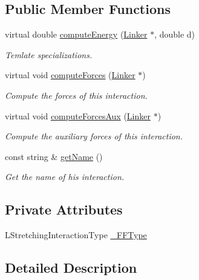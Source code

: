\subsection*{Public Member Functions}
\begin{DoxyCompactItemize}
\item 
virtual double \hyperlink{classLinkerStretching_aaca285f2ce307bb4d5f151ae88f46f95}{compute\+Energy} (\hyperlink{classLinker}{Linker} $\ast$, double d)
\begin{DoxyCompactList}\small\item\em Temlate specializations. \end{DoxyCompactList}\item 
virtual void \hyperlink{classLinkerStretching_a3db719101f86eb671ad0973e0e0569cd}{compute\+Forces} (\hyperlink{classLinker}{Linker} $\ast$)
\begin{DoxyCompactList}\small\item\em Compute the forces of this interaction. \end{DoxyCompactList}\item 
virtual void \hyperlink{classLinkerStretching_af9beb4141f4682570624c7e6d4c71e87}{compute\+Forces\+Aux} (\hyperlink{classLinker}{Linker} $\ast$)
\begin{DoxyCompactList}\small\item\em Compute the auxiliary forces of this interaction. \end{DoxyCompactList}\item 
const string \& \hyperlink{classLinkerInteractions_a019c8595b26cab389d3392bbe2eb9f6e}{get\+Name} ()
\begin{DoxyCompactList}\small\item\em Get the name of his interaction. \end{DoxyCompactList}\end{DoxyCompactItemize}
\subsection*{Private Attributes}
\begin{DoxyCompactItemize}
\item 
L\+Stretching\+Interaction\+Type \hyperlink{classLinkerStretching_a8e3b83b50b7b495fb603dd1e74ac38bb}{\+\_\+\+F\+F\+Type}
\end{DoxyCompactItemize}


\subsection{Detailed Description}
